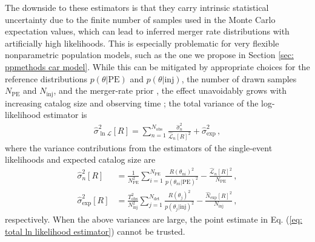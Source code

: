 \begin{refsection}
The downside to these estimators is that they carry intrinsic statistical uncertainty due to the finite number of samples used in the Monte Carlo expectation values, which can lead to inferred merger rate distributions with artificially high likelihoods. This is especially problematic for very flexible nonparametric population models, such as the one we propose in Section \ref{sec: ppmethods car model}. While this can be mitigated by appropriate choices for the reference distributions $p(\theta|\mathrm{PE})$ and $p(\theta|\mathrm{inj})$, the number of drawn samples $N_\mathrm{PE}$ and $N_\mathrm{inj}$, and the merger-rate prior \cite{Essick:2022ojx}, the effect unavoidably grows with increasing catalog size and observing time \cite{Talbot:2023pex}; the total variance of the log-likelihood estimator is
\begin{align}
\hat{\sigma}_{\ln \mathcal{L}}^2 [R]
=
\sum_{n=1}^{N_\mathrm{obs}}
\frac
{ \hat{\sigma}_n^2 }
{ \hat{\mathcal{L}}_n[R]^2 }
+
\hat{\sigma}_\mathrm{exp}^2
\, ,
\label{eq: likelihood variance}
\end{align}
where the variance contributions from the estimators of the single-event likelihoods and expected catalog size are
\begin{align}
\hat{\sigma}_n^2 [R]
& =
\frac { 1 } { N_\mathrm{PE}^2 }
\sum_{i=1}^{N_\mathrm{PE}}
\frac { R(\theta_{ni})^2 } { p(\theta_{ni} | \mathrm{PE} )^2 }
-
\frac { \hat{\mathcal{L}}_n[R]^2 } { N_\mathrm{PE} }
\, ,
\\
\hat{\sigma}_\mathrm{exp}^2 [R]
& =
\frac { T_\mathrm{obs}^2 } { N_\mathrm{inj}^2 }
\sum_{j=1}^{N_\mathrm{det}}
\frac { R(\theta_j)^2 } { p(\theta_j|\mathrm{inj})^2 }
-
\frac { \hat{N}_\mathrm{exp}[R]^2 } { N_\mathrm{inj} }
\, , 
\label{eq: variance terms}
\end{align}
respectively. When the above variances are large, the point estimate in Eq. (\ref{eq: total ln likelihood estimator}) cannot be trusted.


\end{refsection}
